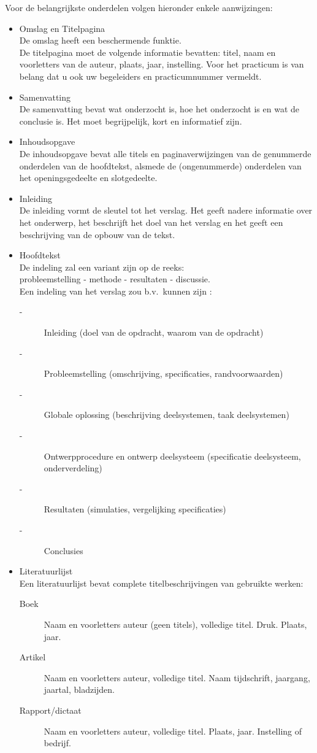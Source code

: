 Voor de belangrijkste onderdelen volgen hieronder enkele aanwijzingen:
\begin{itemize}
\item
Omslag en Titelpagina\\ 
De omslag heeft een beschermende funktie. \\
De titelpagina moet de volgende informatie bevatten: titel, naam en 
voorletters van de auteur, plaats, jaar, instelling. Voor het practicum is van 
belang dat u ook uw begeleiders en practicumnummer vermeldt.
\item
Samenvatting\\ 
De samenvatting bevat wat onderzocht is, hoe het onderzocht is en wat de 
conclusie is. Het moet begrijpelijk, kort en informatief zijn.  
\item
Inhoudsopgave \\
De inhoudsopgave bevat alle titels en paginaverwijzingen van de genummerde 
onderdelen van de hoofdtekst, alsmede de (ongenummerde) onderdelen van het 
openingsgedeelte en slotgedeelte. 
\item
Inleiding \\
De inleiding vormt de sleutel tot het verslag. Het geeft nadere informatie 
over het onderwerp, het beschrijft het doel van het verslag en het geeft een 
beschrijving van de opbouw van de tekst. 
\item
Hoofdtekst\\ 
De indeling zal een variant zijn op de reeks:\\
 probleemstelling - methode - resultaten - discussie.\\
Een indeling van het verslag zou b.v.\ kunnen zijn :
\begin{description}
\item[-] Inleiding (doel van de opdracht, waarom van de opdracht) 
\item[-] Probleemstelling (omschrijving, specificaties, randvoorwaarden) 
\item[-] Globale oplossing (beschrijving deelsystemen, taak deelsystemen) 
\item[-] Ontwerpprocedure en ontwerp deelsysteem (specificatie deelsysteem, onderverdeling)  
\item[-] Resultaten (simulaties, vergelijking specificaties)
\item[-] Conclusies
\end{description}
\item
Literatuurlijst \\
Een literatuurlijst bevat complete titelbeschrijvingen van gebruikte werken:
\begin{description}
\item[Boek] Naam en voorletters auteur (geen titels), volledige titel. 
Druk. Plaats, jaar. 
\item[Artikel] Naam en voorletters auteur, volledige titel.
Naam tijdschrift, jaargang, jaartal, bladzijden. 
\item[Rapport/dictaat] Naam en voorletters auteur, volledige titel. 
Plaats, jaar. Instelling of bedrijf. 
\end{description}
\end{itemize}
